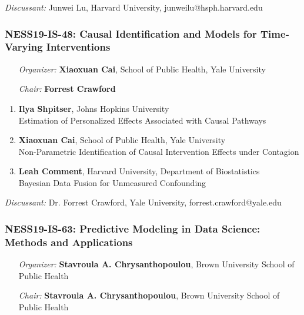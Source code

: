 \emph{Discussant:} Junwei Lu, Harvard University, junweilu@hsph.harvard.edu

\subsubsection*{NESS19-IS-48: Causal Identification and Models for Time-Varying Interventions}

\begin{enumerate}[align=left]
\item [\emph{Organizer:}] \textbf{Xiaoxuan Cai}, School of Public Health, Yale University \\
\item [\emph{Chair:}] \textbf{Forrest Crawford}
\end{enumerate}

\begin{enumerate}
\item \textbf{Ilya Shpitser}, Johns Hopkins University \\
Estimation of Personalized Effects Associated with Causal Pathways
\item \textbf{Xiaoxuan Cai}, School of Public Health, Yale University \\
Non-Parametric Identification of Causal Intervention Effects under Contagion
\item \textbf{Leah Comment}, Harvard University, Department of Biostatistics \\
Bayesian Data Fusion for Unmeasured Confounding
\end{enumerate}

\emph{Discussant:} Dr. Forrest Crawford, Yale University, forrest.crawford@yale.edu

\subsubsection*{NESS19-IS-63: Predictive Modeling in Data Science: Methods and Applications}

\begin{enumerate}[align=left]
\item [\emph{Organizer:}] \textbf{Stavroula A. Chrysanthopoulou}, Brown University School of Public Health \\
\item [\emph{Chair:}] \textbf{Stavroula A. Chrysanthopoulou}, Brown University School of Public Health
\end{enumerate}

